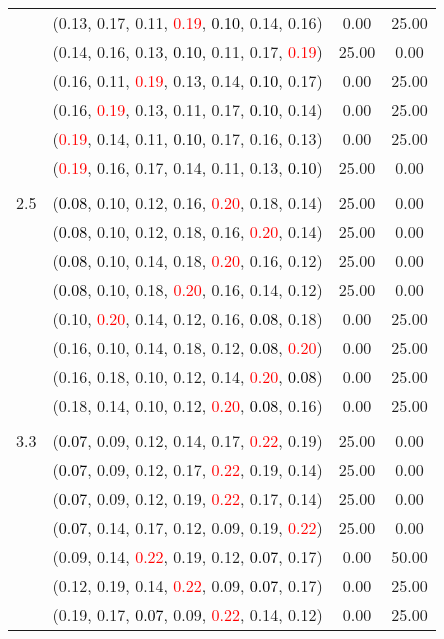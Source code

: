 \documentclass[10pt,a4paper]{report}
\begin{document}
\begin{center}
\begin{longtable}{clcc}
			&(0.13, 0.17, 0.11, \textcolor{red}{0.19}, \textcolor{black}{0.10}, 0.14, 0.16)&0.00&25.00\\
			&(0.14, 0.16, 0.13, \textcolor{black}{0.10}, 0.11, 0.17, \textcolor{red}{0.19})&25.00&0.00\\
			&(0.16, 0.11, \textcolor{red}{0.19}, 0.13, 0.14, \textcolor{black}{0.10}, 0.17)&0.00&25.00\\
			&(0.16, \textcolor{red}{0.19}, 0.13, 0.11, 0.17, \textcolor{black}{0.10}, 0.14)&0.00&25.00\\
			&(\textcolor{red}{0.19}, 0.14, 0.11, \textcolor{black}{0.10}, 0.17, 0.16, 0.13)&0.00&25.00\\
			&(\textcolor{red}{0.19}, 0.16, 0.17, 0.14, 0.11, 0.13, \textcolor{black}{0.10})&25.00&0.00\\
		&&&\\
		2.5			&(\textcolor{black}{0.08}, 0.10, 0.12, 0.16, \textcolor{red}{0.20}, 0.18, 0.14)&25.00&0.00\\
			&(\textcolor{black}{0.08}, 0.10, 0.12, 0.18, 0.16, \textcolor{red}{0.20}, 0.14)&25.00&0.00\\
			&(\textcolor{black}{0.08}, 0.10, 0.14, 0.18, \textcolor{red}{0.20}, 0.16, 0.12)&25.00&0.00\\
			&(\textcolor{black}{0.08}, 0.10, 0.18, \textcolor{red}{0.20}, 0.16, 0.14, 0.12)&25.00&0.00\\
			&(0.10, \textcolor{red}{0.20}, 0.14, 0.12, 0.16, \textcolor{black}{0.08}, 0.18)&0.00&25.00\\
			&(0.16, 0.10, 0.14, 0.18, 0.12, \textcolor{black}{0.08}, \textcolor{red}{0.20})&0.00&25.00\\
			&(0.16, 0.18, 0.10, 0.12, 0.14, \textcolor{red}{0.20}, \textcolor{black}{0.08})&0.00&25.00\\
			&(0.18, 0.14, 0.10, 0.12, \textcolor{red}{0.20}, \textcolor{black}{0.08}, 0.16)&0.00&25.00\\
		&&&\\
		3.3			&(\textcolor{black}{0.07}, 0.09, 0.12, 0.14, 0.17, \textcolor{red}{0.22}, 0.19)&25.00&0.00\\
			&(\textcolor{black}{0.07}, 0.09, 0.12, 0.17, \textcolor{red}{0.22}, 0.19, 0.14)&25.00&0.00\\
			&(\textcolor{black}{0.07}, 0.09, 0.12, 0.19, \textcolor{red}{0.22}, 0.17, 0.14)&25.00&0.00\\
			&(\textcolor{black}{0.07}, 0.14, 0.17, 0.12, 0.09, 0.19, \textcolor{red}{0.22})&25.00&0.00\\
			&(0.09, 0.14, \textcolor{red}{0.22}, 0.19, 0.12, \textcolor{black}{0.07}, 0.17)&0.00&50.00\\
			&(0.12, 0.19, 0.14, \textcolor{red}{0.22}, 0.09, \textcolor{black}{0.07}, 0.17)&0.00&25.00\\
			&(0.19, 0.17, \textcolor{black}{0.07}, 0.09, \textcolor{red}{0.22}, 0.14, 0.12)&0.00&25.00\\
		\bottomrule
	\end{longtable}
\end{center}
\end{document}
